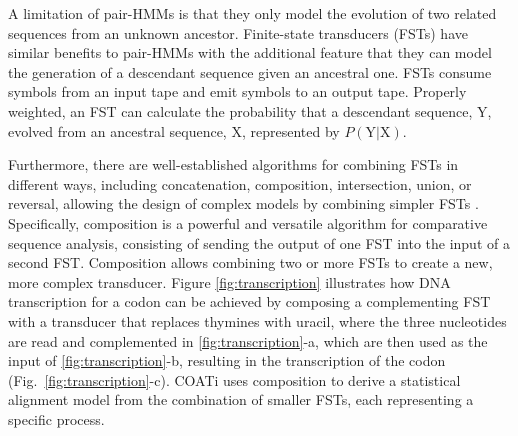 \documentclass[12pt,letterpaper]{article}
\begin{document}
A limitation of pair-HMMs is that they only model the evolution of two related sequences from an unknown ancestor.
Finite-state transducers (FSTs) have similar benefits to pair-HMMs with the additional feature that they can model the generation of a descendant sequence given an ancestral one.
FSTs consume symbols from an input tape and emit symbols to an output tape.
Properly weighted, an FST can calculate the probability that a descendant sequence, $\text{Y}$, evolved from an ancestral sequence, $\text{X}$, represented by $P(\text{Y} | \text{X})$.

Furthermore, there are well-established algorithms for combining FSTs in different ways, including concatenation, composition, intersection, union, or reversal, allowing the design of complex models by combining simpler FSTs \citep{bradley2007transducers,silvestre2021machine}.
Specifically, composition is a powerful and versatile algorithm for comparative sequence analysis, consisting of sending the output of one FST into the input of a second FST.
Composition allows combining two or more FSTs to create a new, more complex transducer. Figure \ref{fig:transcription} illustrates how DNA transcription for a codon can be achieved by composing a complementing FST with a transducer that replaces thymines with uracil, where the three nucleotides are read and complemented in \ref{fig:transcription}-a, which are then used as the input of \ref{fig:transcription}-b, resulting in the transcription of the codon (Fig.~\ref{fig:transcription}-c). COATi uses composition to derive a statistical alignment model from the combination of smaller FSTs, each representing a specific process.
\end{document}
